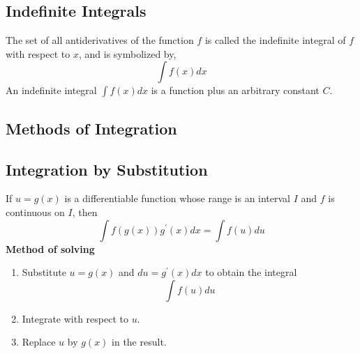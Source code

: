 \subsection{Indefinite Integrals}
The set of all antiderivatives of the function $ f$ is called the
indefinite integral of $ f$ with respect to $ x$, and is symbolized by,
$$
\int f(x) d x
$$
An indefinite integral $\int f(x) d x$ is a function plus an arbitrary constant $C$.
\subsection{Methods of Integration}

\subsection{Integration by Substitution}
If $u=g(x)$ is a differentiable function whose range is an interval $I$ and $f$ is continuous on $I$, then
$$
\int f(g(x)) g^{\prime}(x) d x=\int f(u) d u
$$
\textbf{ Method of solving}
\begin{enumerate}
	\item Substitute $u=g(x)$ and $d u=g^{\prime}(x) d x$ to obtain the integral
	$$
	\int f(u) d u
	$$
	\item Integrate with respect to $u$.
	\item Replace $u$ by $g(x)$ in the result.
\end{enumerate}

